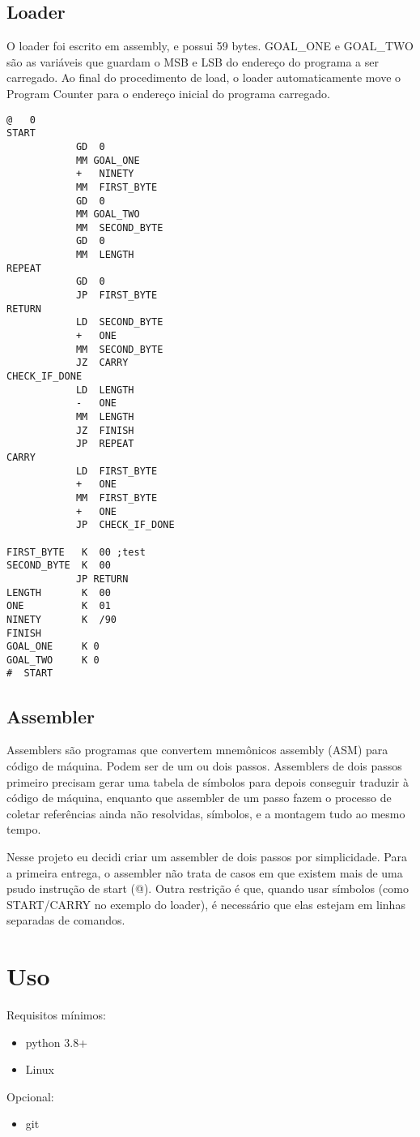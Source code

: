 \documentclass[11pt]{article}
\begin{document}
\subsection{Loader}
\label{sec:org7a240fc}
O loader foi escrito em assembly, e possui 59 bytes. GOAL\_ONE e GOAL\_TWO são as variáveis que guardam o MSB e LSB do endereço do programa a ser carregado. Ao final do procedimento de load, o loader automaticamente move o Program Counter para o endereço inicial do programa carregado.
\begin{verbatim}
@   0
START
            GD  0
            MM GOAL_ONE
            +   NINETY
            MM  FIRST_BYTE
            GD  0
            MM GOAL_TWO
            MM  SECOND_BYTE
            GD  0
            MM  LENGTH
REPEAT
            GD  0
            JP  FIRST_BYTE
RETURN
            LD  SECOND_BYTE
            +   ONE
            MM  SECOND_BYTE
            JZ  CARRY
CHECK_IF_DONE
            LD  LENGTH
            -   ONE
            MM  LENGTH
            JZ  FINISH
            JP  REPEAT
CARRY
            LD  FIRST_BYTE
            +   ONE
            MM  FIRST_BYTE
            +   ONE
            JP  CHECK_IF_DONE

FIRST_BYTE   K  00 ;test
SECOND_BYTE  K  00
            JP RETURN
LENGTH       K  00
ONE          K  01
NINETY       K  /90
FINISH
GOAL_ONE     K 0
GOAL_TWO     K 0
#  START
\end{verbatim}
\subsection{Assembler}
\label{sec:org440c487}
Assemblers são programas que convertem mnemônicos assembly (ASM) para código de
máquina. Podem ser de um ou dois passos. Assemblers de dois passos primeiro
precisam gerar uma tabela de símbolos para depois conseguir traduzir à código de
máquina, enquanto que assembler de um passo fazem o processo de coletar
referências ainda não resolvidas, símbolos, e a montagem tudo ao mesmo tempo.

Nesse projeto eu decidi criar um assembler de dois passos por simplicidade. Para
a primeira entrega, o assembler não trata de casos em que existem mais de uma
psudo instrução de start (@). Outra restrição é que, quando usar símbolos (como
START/CARRY no exemplo do loader), é necessário que elas estejam em linhas
separadas de comandos.

\section{Uso}
\label{sec:org811e0d5}
Requisitos mínimos:
\begin{itemize}
\item python 3.8+
\item Linux
\end{itemize}
Opcional:
\begin{itemize}
\item git
\end{itemize}
\end{document}
